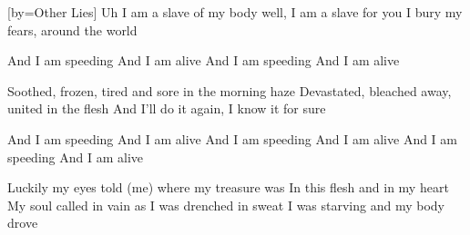 [by={Other Lies}]
  \chordsoff
  \beginverse
  Uh I am a slave of my body well,
  I am a slave for you
  I bury my fears, around the world
  \endverse

  \beginchorus
  And I am speeding And I am alive
  And I am speeding And I am alive
  \endchorus

  \beginverse
  Soothed, frozen, tired and sore in the morning haze
  Devastated, bleached away, united in the flesh  
  And I’ll do it again, I know it for sure
  \endverse
  
  \beginchorus
  And I am speeding And I am alive
  And I am speeding And I am alive
  And I am speeding And I am alive
  \endchorus
  
  \beginverse
  Luckily my eyes told (me) where my treasure was
  In this flesh and in my heart
  My soul called in vain as I was drenched in sweat
  I was starving and my body drove
  \endverse

  
\endsong
